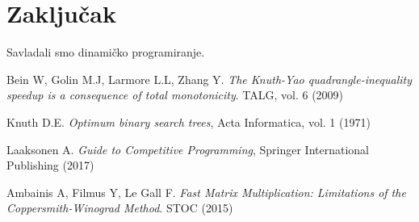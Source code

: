 \documentclass[a4paper,12pt]{article}
\numberwithin{equation}{subsection}
\begin{document}
\section{Zaklju\v cak}

Savladali smo dinami\v cko programiranje.


\begin{thebibliography}{10}

 Bein W, Golin M.J, Larmore L.L, Zhang Y. \textit{The Knuth-Yao quadrangle-inequality speedup is a consequence of total monotonicity}. TALG, vol. 6 (2009)

 Knuth D.E. \textit{Optimum binary search trees}, Acta Informatica, vol. 1 (1971)

 Laaksonen A. \textit{Guide to Competitive Programming}, Springer International Publishing (2017)

 Ambainis A, Filmus Y, Le Gall F. \textit{Fast Matrix Multiplication: Limitations of the Coppersmith-Winograd Method}. STOC (2015)

\end{thebibliography}
\end{document}
